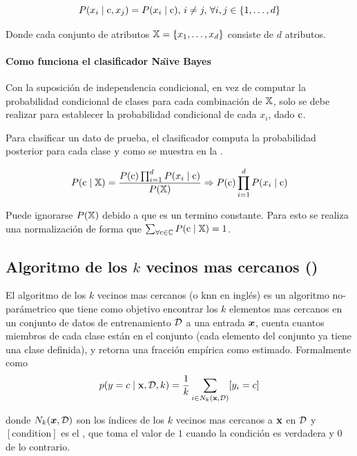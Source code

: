 \begin{equation} \label{eq:bayes-conditional-independence}
  P(x_i \mid {\textnormal{c}}, x_j) = P(x_i \mid {\textnormal{c}}), \, i \neq j, \, \forall i, j \in \{1, \ldots, d\}
\end{equation}

Donde cada conjunto de atributos ${\mathbb{X}}=\{ x_1, \ldots, x_d \}$ consiste de $d$ atributos.
\paragraph{Como funciona el clasificador Na\"{\i}ve Bayes}
Con la suposición de independencia condicional, en vez de computar la probabilidad condicional de clases para cada combinación de ${\mathbb{X}}$, solo se debe realizar para establecer la probabilidad condicional de cada $x_i$, dado ${\textnormal{c}}$.

Para clasificar un dato de prueba, el clasificador computa la probabilidad posterior para cada clase ${\textnormal{y}}$ como se muestra en la .

\begin{equation} \label{eq:bayes-classifier}
  P({\textnormal{c}}\mid {\mathbb{X}}) = \frac{P({\textnormal{c}}) \prod_{i=1}^{d}P(x_i\mid{\textnormal{c}})}{P({\mathbb{X}})} \Rightarrow P({\textnormal{c}}) \prod_{i=1}^{d}P(x_i\mid{\textnormal{c}})
\end{equation}

Puede ignorarse $P({\mathbb{X}})$ debido a que es un termino constante. Para esto se realiza una normalización de forma que $\sum_{\forall {\textnormal{c}} \in {\mathbb{C}}} P({\textnormal{c}}\mid {\mathbb{X}}) = 1$.


\subsection{Algoritmo de los $k$ vecinos mas cercanos ()}
El algoritmo de los $k$ vecinos mas cercanos (o \gls{knn} en inglés) es un algoritmo no-parámetrico que tiene como objetivo encontrar los $k$ elementos mas cercanos en un conjunto de datos de entrenamiento $\mathcal{D}$ a una entrada ${\bm{x}}$, cuenta cuantos miembros de cada clase están en el conjunto (cada elemento del conjunto ya tiene una clase definida), y retorna una fracción empírica como estimado. Formalmente como
\begin{equation} \label{eq:prob-knn}
  p(y = c \mid {\mathbf{x}}, \mathcal{D}, k) = \frac{1}{k} \sum_{i \in N_k({\mathbf{x}}, \mathcal{D})} [y_i = c]
\end{equation}

donde $N_k({\bm{x}}, \mathcal{D})$ son los índices de los $k$ vecinos mas cercanos a ${\mathbf{x}}$ en $\mathcal{D}$ y $[\mathrm{condition}]$ es el , que toma el valor de $1$ cuando la condición es verdadera y $0$ de lo contrario.

